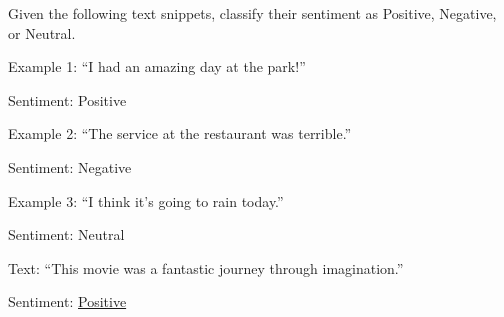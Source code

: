 \vspace{0.5em}
\begin{tcolorbox}
\begin{center}
\parbox{0.9\textwidth}
{

{\color{blue} Given the following text snippets, classify their sentiment as Positive, Negative, or Neutral.}

\vspace{0.5em}

{\color{ugreen} Example 1: ``I had an amazing day at the park!''}

{\color{ugreen} Sentiment: Positive}

\vspace{0.3em}

{\color{ugreen} Example 2: ``The service at the restaurant was terrible.''}

{\color{ugreen} Sentiment: Negative}

\vspace{0.3em}

{\color{ugreen} Example 3: ``I think it's going to rain today.''}

{\color{ugreen} Sentiment: Neutral}

\vspace{0.5em}

{\color{blue} Text: ``This movie was a fantastic journey through imagination.''}

{\color{blue} Sentiment:} \underline{Positive}

}
\end{center}
\end{tcolorbox}
\vspace{0.5em}

